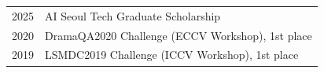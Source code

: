 \begin{longtable}[l]{@{}p{} p{}}
    2025 & AI Seoul Tech Graduate Scholarship \\
    2020 & DramaQA2020 Challenge (ECCV Workshop), 1st place \\
    2019 & LSMDC2019 Challenge (ICCV Workshop), 1st place \\
\end{longtable}
